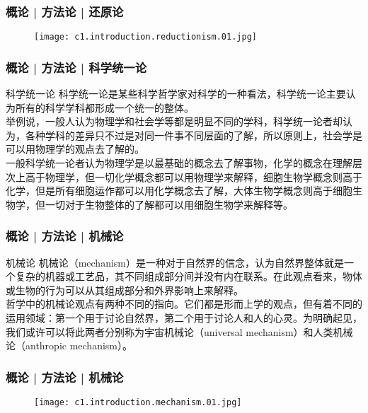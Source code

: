 \begin{frame}
  \frametitle{概论 | 方法论 | 还原论}
  \begin{figure}
    \centering
    \texttt{[image: c1.introduction.reductionism.01.jpg]}
  \end{figure}
\end{frame}

\begin{frame}
  \frametitle{概论 | 方法论 | 科学统一论}
  \begin{block}{科学统一论}
科学统一论是某些科学哲学家对科学的一种看法，科学统一论主要认为所有的科学学科都形成一个统一的整体。\\
\vspace{1em}
举例说，一般人认为物理学和社会学等都是明显不同的学科，科学统一论者却认为，各种学科的差异只不过是对同一件事不同层面的了解，所以原则上，社会学是可以用物理学的观点去了解的。\\
\vspace{1em}
一般科学统一论者认为物理学是以最基础的概念去了解事物，化学的概念在理解层次上高于物理学，但一切化学概念都可以用物理学来解释，细胞生物学概念则高于化学，但是所有细胞运作都可以用化学概念去了解，大体生物学概念则高于细胞生物学，但一切对于生物整体的了解都可以用细胞生物学来解释等。
  \end{block}
\end{frame}

\begin{frame}
  \frametitle{概论 | 方法论 | 机械论}
  \begin{block}{机械论}
机械论（mechanism）是一种对于自然界的信念，认为自然界整体就是一个复杂的机器或工艺品，其不同组成部分间并没有内在联系。在此观点看来，物体或生物的行为可以从其组成部分和外界影响上来解释。\\
\vspace{1em}
哲学中的机械论观点有两种不同的指向。它们都是形而上学的观点，但有着不同的运用领域：第一个用于讨论自然界，第二个用于讨论人和人的心灵。为明确起见，我们或许可以将此两者分别称为宇宙机械论（universal mechanism）和人类机械论（anthropic mechanism）。
  \end{block}
\end{frame}

\begin{frame}
  \frametitle{概论 | 方法论 | 机械论}
  \begin{figure}
    \centering
    \texttt{[image: c1.introduction.mechanism.01.jpg]}
  \end{figure}
\end{frame}

